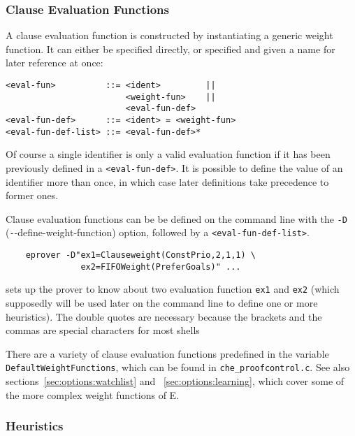 \documentclass{report}
\begin{document}
\subsubsection{Clause Evaluation Functions}

A clause evaluation function is constructed by instantiating a generic
weight function. It can either be specified directly, or specified and
given a name for later reference at once:

 \begin{verbatim}
<eval-fun>          ::= <ident>         ||
                        <weight-fun>    ||
                        <eval-fun-def>
<eval-fun-def>      ::= <ident> = <weight-fun>
<eval-fun-def-list> ::= <eval-fun-def>*
\end{verbatim}

Of course a single identifier is only a valid evaluation function if
it has been previously defined in a \texttt{<eval-fun-def>}. It is
possible to define the value of an identifier more than once, in which
case later definitions take precedence to former ones.

Clause evaluation functions can be be defined on the command line with
the \texttt{-D} (\texttt--{define-weight-function}) option, followed
by a \texttt{<eval-fun-def-list>}.

\begin{example}
\begin{verbatim}
    eprover -D"ex1=Clauseweight(ConstPrio,2,1,1) \
               ex2=FIFOWeight(PreferGoals)" ...
\end{verbatim}
  sets up the prover to know about two evaluation function
  \texttt{ex1} and \texttt{ex2} (which supposedly will be used later on
  the command line to define one or more heuristics). The double
  quotes are necessary because the brackets and the commas are
  special characters for most shells
\end{example}

There are a variety of clause evaluation functions predefined in
the variable \texttt{DefaultWeightFunctions}, which can be found in
\texttt{che\_proofcontrol.c}. See also
sections~\ref{sec:options:watchlist} and ~\ref{sec:options:learning},
which cover some of the more complex weight functions of E.


\subsubsection{Heuristics}
\end{document}

